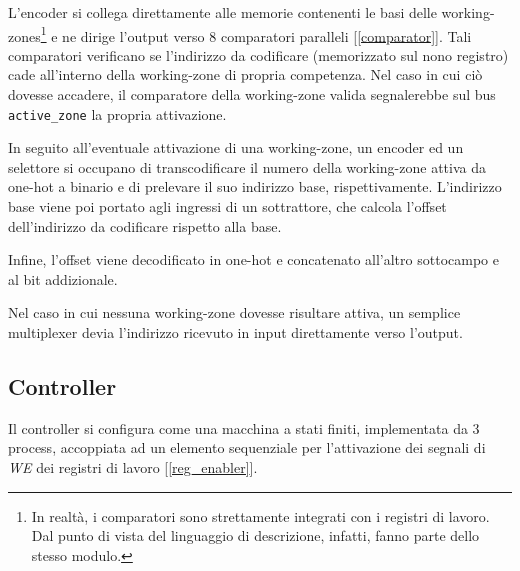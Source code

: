 \documentclass[11pt,a4paper]{article}
\begin{document}
L'encoder si collega direttamente alle memorie contenenti le basi delle working-zones\footnote{In realtà, i comparatori sono strettamente integrati con i
registri di lavoro. Dal punto di vista del linguaggio di descrizione, infatti, fanno parte dello stesso modulo.} e ne dirige l'output verso 8 comparatori
paralleli [\ref{comparator}].
Tali comparatori verificano se l'indirizzo da codificare (memorizzato sul nono registro) cade all'interno della working-zone di propria competenza. Nel
caso in cui ciò dovesse accadere, il comparatore della working-zone valida segnalerebbe sul bus \lstinline{active_zone} la propria attivazione.

In seguito all'eventuale attivazione di una working-zone, un encoder ed un selettore si occupano di transcodificare il numero della working-zone attiva
da one-hot a binario e di prelevare il suo indirizzo base, rispettivamente. L'indirizzo base viene poi portato agli ingressi di un sottrattore, che
calcola l'offset dell'indirizzo da codificare rispetto alla base.

Infine, l'offset viene decodificato in one-hot e concatenato all'altro sottocampo e al bit addizionale.

Nel caso in cui nessuna working-zone dovesse risultare attiva, un semplice multiplexer devia l'indirizzo ricevuto in input direttamente verso l'output.

\subsection{Controller}
Il controller si configura come una macchina a stati finiti, implementata da 3 process, accoppiata ad un elemento sequenziale per l'attivazione dei
segnali di \emph{WE} dei registri di lavoro [\ref{reg_enabler}].
\end{document}
